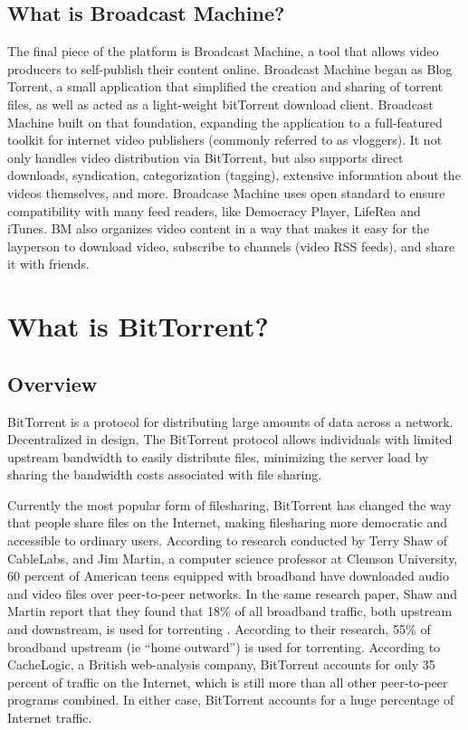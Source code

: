 \documentclass[a4paper,12pt]{report}
\begin{document}
\section{What is Broadcast Machine?}
	The final piece of the platform is Broadcast Machine, a tool that allows video producers to self-publish their content online.
	Broadcast Machine  began as Blog Torrent, a small application that simplified the creation and sharing of torrent files, as well as acted as a light-weight bitTorrent download client. 
Broadcast Machine built on that foundation, expanding the application to a full-featured toolkit for internet video publishers (commonly referred to as vloggers).
It not only handles video distribution via BitTorrent, but also supports direct downloads, syndication, categorization (tagging), extensive information about the videos themselves, and more.
Broadcase Machine uses open standard to ensure compatibility with many feed readers, like Democracy Player, LifeRea and iTunes.
BM also organizes video content in a way that makes it easy for the layperson to download video, subscribe to channels (video RSS feeds), and share it with friends.

\chapter{What is BitTorrent?}
\section{Overview}
BitTorrent is a protocol for distributing large amounts of data across a network. 
Decentralized in design, The BitTorrent protocol allows individuals with limited upstream bandwidth to easily distribute files, minimizing the server load by sharing the bandwidth costs associated with file sharing. 

Currently the most popular form of filesharing, BitTorrent has changed the way that people share files on the Internet, making filesharing more democratic and accessible to ordinary users.
According to research conducted by Terry Shaw of CableLabs, and Jim Martin, a computer science professor at Clemson University, 60 percent of American teens equipped with broadband have downloaded audio and video files over peer-to-peer networks. 
In the same research paper, Shaw and Martin report that they found that 18\% of all broadband traffic, both upstream and downstream, is used for torrenting . 
According to their research, 55\% of broadband upstream (ie “home outward”) is used for torrenting. 
According to CacheLogic, a British web-analysis company, BitTorrent accounts for only 35 percent of traffic on the Internet, which is still more than all other peer-to-peer programs combined.  
In either case, BitTorrent accounts for a huge percentage of Internet traffic.
\end{document}
